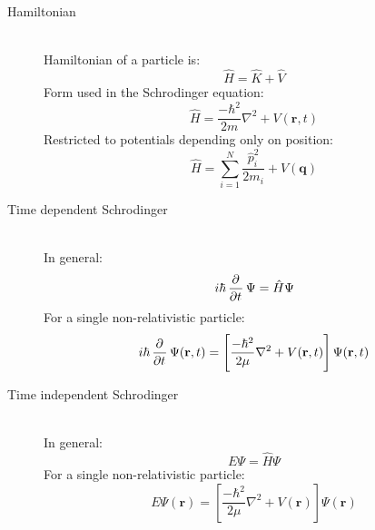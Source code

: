 \documentclass[12pt,letterpaper,oneside,final,titlepage]{article}               %
\numberwithin{equation}{section} %
\renewcommand{\vec}[1]{\mathbf{#1}}
\begin{document}
\begin{description}

    \item[Hamiltonian] \hfill \\
    Hamiltonian of a particle is:
    \begin{equation}
    	\hat{H} = \hat{K} + \hat{V}
    \end{equation}
    Form used in the Schrodinger equation:
    \begin{equation}
    	\hat{H} = \frac{-\hbar^{2}}{2m}\nabla^{2} + V(\vec{r},t)
    \end{equation}
    Restricted to potentials depending only on position:
    \begin{equation}
    	\hat{H} = \sum_{i=1}^{N}\frac{\hat{p}_{i}^2}{2m_{i}} + V(\vec{q})
    \end{equation}

    \item[Time dependent Schrodinger] \hfill \\
    In general:
    \begin{equation}
    	i\hbar\dpd{}{t}\Psi = \hat{H}\Psi	
    \end{equation}
    For a single non-relativistic particle:
    \begin{equation}
    	i\hbar\dpd{}{t}\Psi(\vec{r},t) = \left[\frac{-\hbar^{2}}{2\mu}\nabla^{2} + V(\vec{r},t)\right]\Psi(\vec{r},t)
    \end{equation}

    \item[Time independent Schrodinger] \hfill \\
    In general:
    \begin{equation}
    	E\Psi = \hat{H}\Psi
    \end{equation}
    For a single non-relativistic particle:
    \begin{equation}
    	E\Psi(\vec{r}) = \left[\frac{-\hbar^{2}}{2\mu}\nabla^{2} + V(\vec{r})\right]\Psi(\vec{r})
    \end{equation}
\end{description} 
\end{document}
